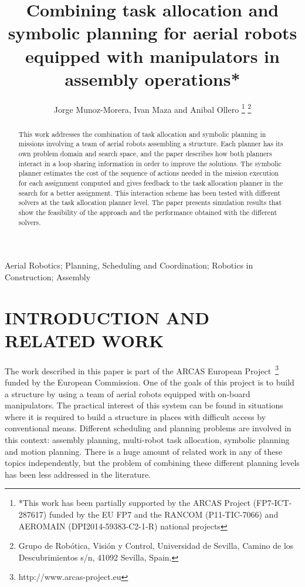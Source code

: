 \documentclass[letterpaper, 10 pt, conference]{ieeeconf}  %
\title{\LARGE \bf
Combining task allocation and symbolic planning for aerial robots equipped with manipulators in assembly operations*
}
\author{Jorge Munoz-Morera, Ivan Maza and Anibal Ollero%
\thanks{*This work has been partially supported by the ARCAS Project (FP7-ICT-287617) funded by the EU FP7 and the RANCOM (P11-TIC-7066) and AEROMAIN (DPI2014-59383-C2-1-R) national projects}%
\thanks{Grupo de Rob\'{o}tica, Visi\'{o}n y Control, Universidad de Sevilla, Camino de los Descubrimientos s/n, 41092 Sevilla, Spain.
\mailsa
}%
}
\begin{document}
\maketitle
\thispagestyle{empty}
\pagestyle{empty}

\graphicspath{{./}{./figures/}}

\begin{abstract}
This work addresses the combination of task allocation and symbolic planning in missions involving a team of aerial robots assembling a structure. Each planner has its own problem domain and search space, and the paper describes how both planners interact in a loop sharing information in order to improve the solutions. The symbolic planner estimates the cost of the sequence of actions needed in the mission execution for each assignment computed and gives feedback to the task allocation planner in the search for a better assignment. This interaction scheme has been tested with different solvers at the task allocation planner level. The paper presents simulation results that show the feasibility of the approach and the performance obtained with the different solvers.
\end{abstract}
\begin{keywords}
Aerial Robotics; Planning, Scheduling and Coordination; Robotics in Construction; Assembly
\end{keywords}

\section{INTRODUCTION AND RELATED WORK}
	\label{sec:intro}

The work described in this paper is part of the ARCAS European Project~\footnote{http://www.arcas-project.eu} funded by the European Commission. One of the goals of this project is to build a structure by using a team of aerial robots equipped with on-board manipulators. The practical interest of this system can be found in situations where it is required to build a structure in places with difficult access by conventional means. Different scheduling and planning problems are involved in this context: assembly planning, multi-robot task allocation, symbolic planning and motion planning. There is a huge amount of related work in any of these topics independently, but the problem of combining these different planning levels has been less addressed in the literature. 
\end{document}
